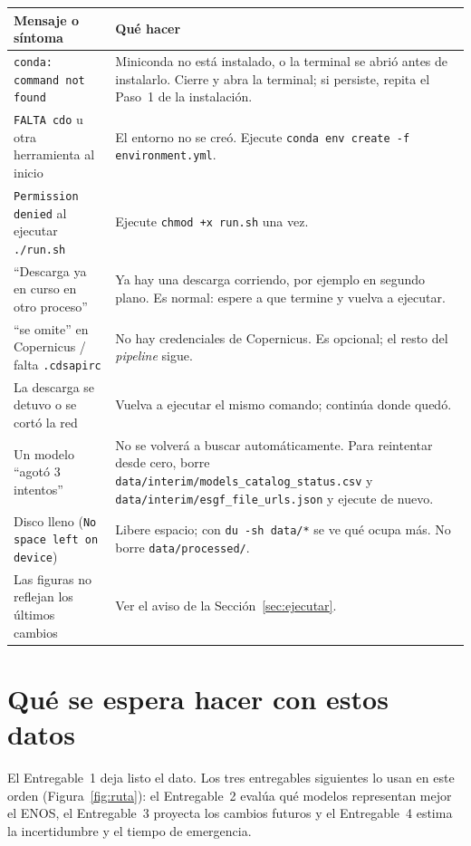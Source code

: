 \documentclass[11pt,a4paper]{article}
\begin{document}
\begin{longtable}{@{}L{5.2cm}L{\dimexpr\textwidth-5.2cm-2\tabcolsep\relax}@{}}
\toprule
Mensaje o síntoma & Qué hacer \\
\midrule\endhead
\texttt{conda: command not found} & Miniconda no está instalado, o la terminal se abrió antes de instalarlo. Cierre y abra la terminal; si persiste, repita el Paso~1 de la instalación. \\
\texttt{FALTA cdo} u otra herramienta al inicio & El entorno no se creó. Ejecute \texttt{conda env create -f environment.yml}. \\
\texttt{Permission denied} al ejecutar \texttt{./run.sh} & Ejecute \texttt{chmod +x run.sh} una vez. \\
``Descarga ya en curso en otro proceso'' & Ya hay una descarga corriendo, por ejemplo en segundo plano. Es normal: espere a que termine y vuelva a ejecutar. \\
``se omite'' en Copernicus / falta \texttt{.cdsapirc} & No hay credenciales de Copernicus. Es opcional; el resto del \emph{pipeline} sigue. \\
La descarga se detuvo o se cortó la red & Vuelva a ejecutar el mismo comando; continúa donde quedó. \\
Un modelo ``agotó 3 intentos'' & No se volverá a buscar automáticamente. Para reintentar desde cero, borre \texttt{data/interim/models\_catalog\_status.csv} y \texttt{data/interim/esgf\_file\_urls.json} y ejecute de nuevo. \\
Disco lleno (\texttt{No space left on device}) & Libere espacio; con \texttt{du -sh data/*} se ve qué ocupa más. No borre \texttt{data/processed/}. \\
Las figuras no reflejan los últimos cambios & Ver el aviso de la Sección~\ref{sec:ejecutar}. \\
\bottomrule
\end{longtable}

\section{Qué se espera hacer con estos datos}

El Entregable~1 deja listo el dato. Los tres entregables siguientes lo usan en este orden (Figura~\ref{fig:ruta}): el Entregable~2 evalúa qué modelos representan mejor el ENOS, el Entregable~3 proyecta los cambios futuros y el Entregable~4 estima la incertidumbre y el tiempo de emergencia.
\end{document}
